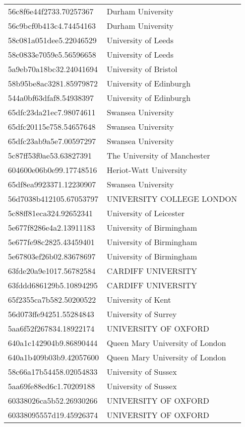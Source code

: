\begin{tabular}{ll}
56c8f6e44f2733.70257367 & Durham University \\
56c9bcf0b413c4.74454163 & Durham University \\
58c081a051dee5.22046529 & University of Leeds \\
58c0833e7059e5.56596658 & University of Leeds \\
5a9eb70a18bc32.24041694 & University of Bristol \\
58b95be8ac3281.85979872 & University of Edinburgh \\
544a0bf63dfaf8.54938397 & University of Edinburgh \\
65dfc23da21ec7.98074611 & Swansea University \\
65dfc20115e758.54657648 & Swansea University \\
65dfc23ab9a5e7.00597297 & Swansea University \\
5c87ff53f0ae53.63827391 & The University of Manchester \\
604600e06b0e99.17748516 & Heriot-Watt University \\
65df8ea9923371.12230907 & Swansea University \\
56d7038b412105.67053797 & UNIVERSITY COLLEGE LONDON \\
5c88ff81eca324.92652341 & University of Leicester \\
5e677f8286e4a2.13911183 & University of Birmingham \\
5e677fe98c2825.43459401 & University of Birmingham \\
5e67803ef26b02.83678697 & University of Birmingham \\
63fde20a9e1017.56782584 & CARDIFF UNIVERSITY \\
63fddd686129b5.10894295 & CARDIFF UNIVERSITY \\
65f2355ca7b582.50200522 & University of Kent \\
56d073ffe94251.55284843 & University of Surrey \\
5aa6f52f267834.18922174 & UNIVERSITY OF OXFORD \\
640a1c142904b9.86890444 & Queen Mary University of London \\
640a1b409b03b9.42057600 & Queen Mary University of London \\
58c66a17b54458.02054833 & University of Sussex \\
5aa69fe88ed6c1.70209188 & University of Sussex \\
60338026ca5b52.26930266 & UNIVERSITY OF OXFORD \\
60338095557d19.45926374 & UNIVERSITY OF OXFORD \\

\end{tabular}

